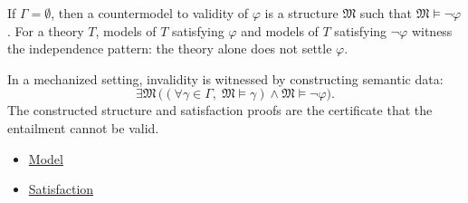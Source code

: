 \begin{remark*}
If $\Gamma=\emptyset$, then a countermodel to validity of $\varphi$ is a
structure $\mathfrak{M}$ such that $\mathfrak{M}\vDash\neg\varphi$. For a
theory $T$, models of $T$ satisfying $\varphi$ and models of $T$ satisfying
$\neg\varphi$ witness the independence pattern: the theory alone does not
settle $\varphi$.
\end{remark*}

\begin{remark*}
In a mechanized setting, invalidity is witnessed by constructing semantic
data:
\[
  \exists\mathfrak{M}\,
  \bigl((\forall\gamma\in\Gamma,\;\mathfrak{M}\vDash\gamma)
  \land
  \mathfrak{M}\vDash\neg\varphi\bigr).
\]
The constructed structure and satisfaction proofs are the certificate that the
entailment cannot be valid.
\end{remark*}

\begin{dependencies}
\begin{itemize}
  \item \hyperref[def:axiom-systems-model]{Model}
  \item \hyperref[def:axiom-systems-satisfaction]{Satisfaction}
\end{itemize}
\end{dependencies}
